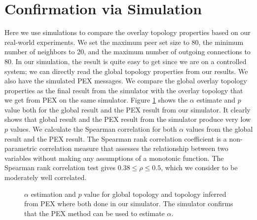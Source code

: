 \documentclass[paper]{ieice}
\begin{document}
\section{Confirmation via Simulation}\label{simulation}
Here we use simulations to compare the overlay topology properties based  on our real-world experiments. 
We set the maximum peer set size to 80, the minimum number of neighbors to 20, and the maximum number of outgoing connections to 80. 
In our simulation, the result is quite easy to get since we are on a controlled system;  we can directly read the  global topology properties from our results. 
We also have the simulated PEX messages. We compare the global overlay topology properties as the final result from the simulator with the overlay topology that we get from PEX on the same simulator.
Figure \ref{fig:simulation} shows the $\alpha$ estimate and $p$ value both for the global result and the PEX result from our simulator. 
It clearly shows that global result and the PEX result from the simulator produce very low $p$ values. 
We calculate the Spearman correlation for both $\alpha$ values from the global result and the PEX result. 
The Spearman rank correlation coefficient is a non-parametric correlation measure that assesses the relationship between two variables
without making any assumptions of a monotonic function.
The Spearman rank correlation test gives $0.38 \leq \rho \leq 0.5$, which we consider to be moderately well correlated. 

\begin{figure}
\centering
{}
\caption{$\alpha$ estimation and $p$ value for global topology and topology inferred from PEX where both done in our simulator.
The simulator confirms that the PEX method can be used to estimate $\alpha$.} 
\label{fig:simulation}
\end{figure}
\end{document}
